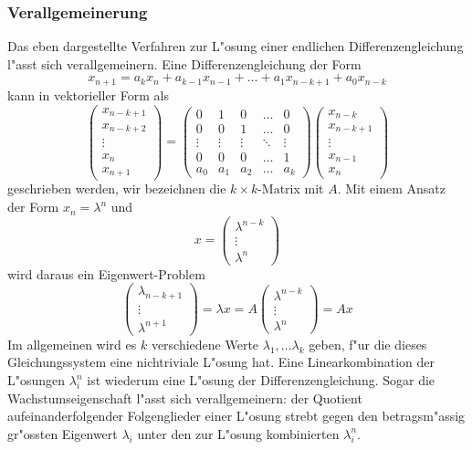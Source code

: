 \subsubsection{Verallgemeinerung}
Das eben dargestellte Verfahren zur L"osung einer endlichen 
Differenzengleichung l"asst sich verallgemeinern.
Eine Differenzengleichung der Form
\[
x_{n+1}=a_kx_n+a_{k-1}x_{n-1}+\dots+a_1x_{n-k+1}+a_0x_{n-k}
\]
kann in vektorieller Form als
\[
\begin{pmatrix}
x_{n-k+1}\\
x_{n-k+2}\\
\vdots\\
x_{n}\\
x_{n+1}
\end{pmatrix}
=
\begin{pmatrix}
0&1&0&\dots&0\\
0&0&1&\dots&0\\
\vdots&\vdots&\vdots&\ddots&\vdots\\
0&0&0&\dots&1\\
a_0&a_1&a_2&\dots&a_k
\end{pmatrix}
\begin{pmatrix}
x_{n-k}\\
x_{n-k+1}\\
\vdots\\
x_{n-1}\\
x_n
\end{pmatrix}
\]
geschrieben werden, wir bezeichnen die $k\times k$-Matrix mit $A$. 
Mit einem Ansatz der Form $x_n=\lambda^n$ und
\[
x=
\begin{pmatrix}
\lambda^{n-k}\\
\vdots\\
\lambda^n
\end{pmatrix}
\]
wird daraus ein
Eigenwert-Problem
\[
\begin{pmatrix}
\lambda_{n-k+1}\\
\vdots\\
\lambda^{n+1}
\end{pmatrix}
=
\lambda x
=A
\begin{pmatrix}
\lambda^{n-k}\\
\vdots\\
\lambda^n
\end{pmatrix}
=Ax
\]
Im allgemeinen wird es $k$ verschiedene Werte $\lambda_1,\dots\lambda_k$ geben,
f"ur die dieses Gleichungssystem eine nichtriviale L"osung hat.
Eine Linearkombination der L"osungen $\lambda_i^n$ ist wiederum eine
L"osung der Differenzengleichung. Sogar die Wachstumseigenschaft l"asst
sich verallgemeinern: der Quotient aufeinanderfolgender Folgenglieder
einer L"osung strebt gegen den betragsm"assig gr"ossten Eigenwert $\lambda_i$
unter den zur L"osung kombinierten $\lambda_i^n$.

